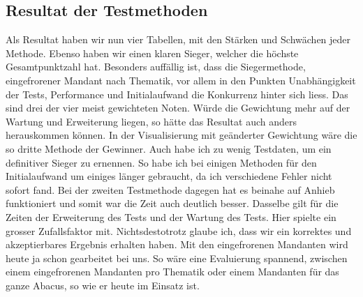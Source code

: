 \subsection{Resultat der Testmethoden}
Als Resultat haben wir nun vier Tabellen, mit den Stärken und Schwächen jeder Methode. Ebenso haben wir einen klaren Sieger, welcher die höchste Gesamtpunktzahl hat. 
Besonders auffällig ist, dass die Siegermethode, eingefrorener Mandant nach Thematik, vor allem in den Punkten Unabhängigkeit der Tests, Performance und Initialaufwand die Konkurrenz hinter sich liess. Das sind drei der vier meist gewichteten Noten. Würde die Gewichtung mehr auf der Wartung und Erweiterung liegen, so hätte das Resultat auch anders herauskommen können. In der Visualisierung mit geänderter Gewichtung wäre die so dritte Methode der Gewinner. Auch habe ich zu wenig Testdaten, um ein definitiver Sieger zu ernennen. So habe ich bei einigen Methoden für den Initialaufwand um einiges länger gebraucht, da ich verschiedene Fehler nicht sofort fand. Bei der zweiten Testmethode dagegen hat es beinahe auf Anhieb funktioniert und somit war die Zeit auch deutlich besser. Dasselbe gilt für die Zeiten der Erweiterung des Tests und der Wartung des Tests. Hier spielte ein grosser Zufallsfaktor mit. Nichtsdestotrotz glaube ich, dass wir ein korrektes und akzeptierbares Ergebnis erhalten haben. Mit den eingefrorenen Mandanten wird heute ja schon gearbeitet bei uns. So wäre eine Evaluierung spannend, zwischen einem eingefrorenen Mandanten pro Thematik oder einem Mandanten für das ganze Abacus, so wie er heute im Einsatz ist.
